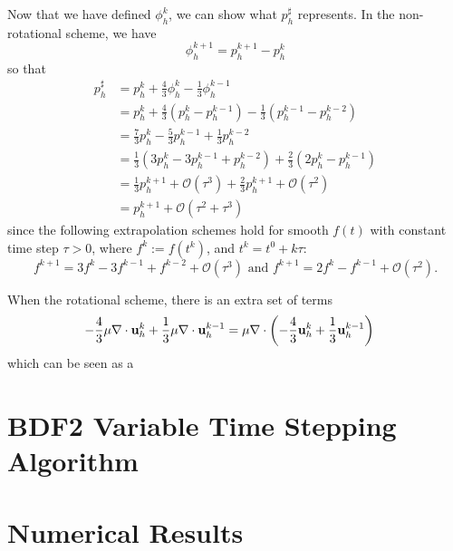 \documentclass[letterpaper]{erdc}
\begin{document}
\begin{remark}
Now that we have defined $\phi_h^{k}$, we can show what $p_h^{\sharp}$ represents.  In the non-rotational scheme, we have
\begin{equation}
  \phi_h^{k+1} = p_h^{k+1} - p_h^{k}
\end{equation}
so that
  \begin{align}
    p_h^{\sharp} &= p_h^{k} + \frac{4}{3}\phi_h^{k} - \frac{1}{3}\phi_h^{k-1}\\
    &= p_h^{k} + \frac{4}{3}\left(p_h^{k} - p_h^{k-1}\right) - \frac{1}{3}\left(p_h^{k-1} - p_h^{k-2}\right)\\
    &= \frac{7}{3}p_h^{k} - \frac{5}{3}p_h^{k-1}+ \frac{1}{3}p_h^{k-2} \\
    &= \frac{1}{3}\left( 3p_h^{k} - 3p_h^{k-1} + p_h^{k-2} \right) + \frac{2}{3}\left(2p_h^{k} - p_h^{k-1}  \right)\\
    &= \frac{1}{3}p_h^{k+1} + \mathcal{O}(\tau^{3}) + \frac{2}{3} p_h^{k+1} + \mathcal{O}(\tau^{2})\\
    &= p_h^{k+1} + \mathcal{O}\left(\tau^2+\tau^3\right)
  \end{align}
  since the following extrapolation schemes hold for smooth $f(t)$ with constant time step $\tau>0$, where $f^{k} := f\left(t^{k}\right)$, and $t^k = t^0+k\tau$:
  \begin{equation}
    f^{k+1} = 3f^k - 3f^{k-1}+f^{k-2} + \mathcal{O}(\tau^3) \mbox{ and } f^{k+1}=2f^{k} - f^{k-1}+\mathcal{O}(\tau^2).
  \end{equation}
  
  When the rotational scheme, there is an extra set of terms
  \begin{align}
    -\frac{4}{3}\mu\nabla\cdot\textbf{u}_h^{k} + \frac{1}{3}\mu\nabla\cdot\textbf{u}_h^{k-1} &= \mu\nabla\cdot\left( -\frac{4}{3}\textbf{u}_h^{k} + \frac{1}{3}\textbf{u}_h^{k-1} \right) 
  \end{align}
  which can be seen as a 
\end{remark}

%
%
%
\section{BDF2 Variable Time Stepping Algorithm}\label{sec:BDF2VariableTimeSteppingAlgorithm}


%
%
%
\section{Numerical Results}\label{sec:NumericalResults}




\appendix
%
%
\end{document}
